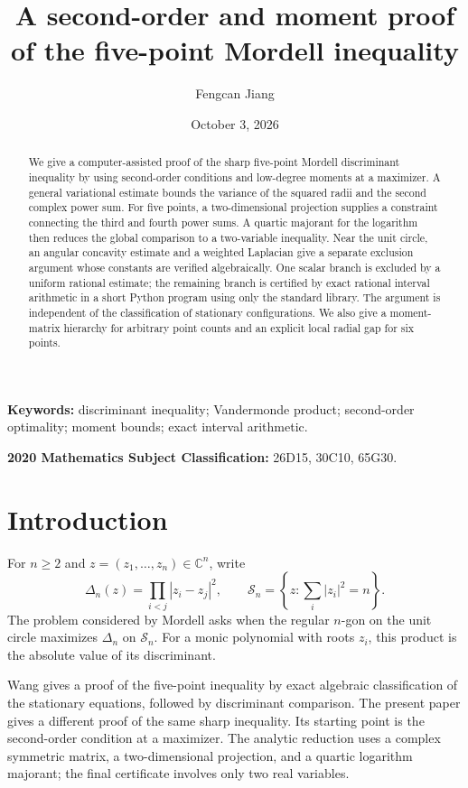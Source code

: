 \documentclass[11pt]{article}
\title{A second-order and moment proof\\of the five-point Mordell inequality}
\author{Fengcan Jiang}
\date{October 3, 2026}
\theoremstyle{remark}
\newcommand{\C}{\mathbb C}
\numberwithin{equation}{section}
\begin{document}
\maketitle
\begin{abstract}
We give a computer-assisted proof of the sharp five-point Mordell
discriminant inequality by using second-order conditions and low-degree
moments at a maximizer. A general variational estimate bounds the variance
of the squared radii and the second complex power sum. For five points,
a two-dimensional projection supplies a constraint connecting the third
and fourth power sums. A quartic majorant for the logarithm then reduces
the global comparison to a two-variable inequality. Near the unit circle,
an angular concavity estimate and a weighted Laplacian give a separate
exclusion argument whose constants are verified algebraically.
One scalar branch is excluded by a uniform rational estimate; the
remaining branch is certified by exact rational interval arithmetic
in a short Python program using only the standard library.
The argument is independent of the classification of stationary
configurations. We also give a moment-matrix hierarchy for arbitrary
point counts and an explicit local radial gap for six points.
\end{abstract}

\noindent\textbf{Keywords:} discriminant inequality; Vandermonde product;
second-order optimality; moment bounds; exact interval arithmetic.

\noindent\textbf{2020 Mathematics Subject Classification:}
26D15, 30C10, 65G30.

\section{Introduction}
For $n\ge2$ and $z=(z_1,\ldots,z_n)\in\C^n$, write
\[
 \Delta_n(z)=\prod_{i<j}|z_i-z_j|^2,\qquad
 \mathcal S_n=\left\{z:\sum_i|z_i|^2=n\right\}.
\]
The problem considered by Mordell \cite{Mordell} asks when the regular
$n$-gon on the unit circle maximizes $\Delta_n$ on $\mathcal S_n$.
For a monic polynomial with roots $z_i$, this product is the absolute
value of its discriminant.

Wang \cite{Wang} gives a proof of the five-point inequality by exact
algebraic classification of the stationary equations, followed by
discriminant comparison. The present paper gives a different proof of
the same sharp inequality. Its starting point is the second-order
condition at a maximizer. The analytic reduction uses a complex
symmetric matrix, a two-dimensional projection, and a quartic logarithm
majorant; the final certificate involves only two real variables.
\end{document}
